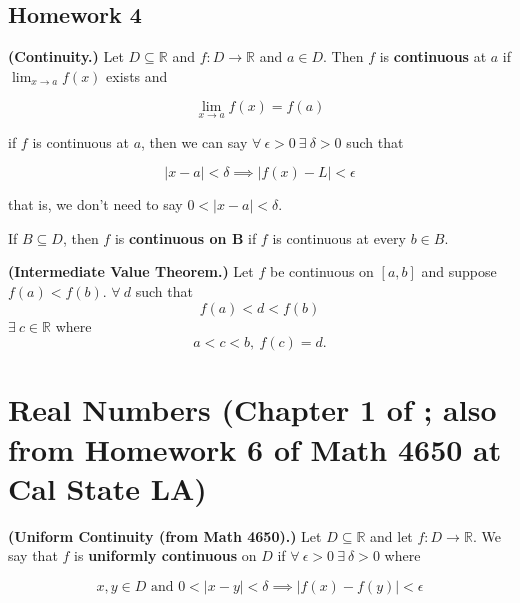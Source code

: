 \subsection{Homework 4}

\begin{definition} \textbf{(Continuity.)} Let \(D \subseteq \mathbb{R}\) and \(f:D \to \mathbb{R}\) and \(a \in D\). Then \(f\) is \textbf{continuous} at \(a\) if \(\lim_{x \to a} f(x)\) exists and 

\[
\lim_{x \to a} f(x) = f(a)
\]

\end{definition}

\begin{remark} if \(f\) is continuous at \(a\), then we can say \(\forall \ \epsilon > 0 \ \exists \ \delta > 0 \) such that

\[
|x - a| < \delta \implies |f(x) - L| < \epsilon
\]

that is, we don't need to say \(0 < |x - a| < \delta\).

\end{remark}

\begin{definition} If \(B \subseteq D\), then \(f\) is \textbf{continuous on B} if \(f\) is continuous at every \(b \in B\).

\end{definition}

\begin{theorem} \textbf{(Intermediate Value Theorem.)} Let \(f\) be continuous on \([a, b]\) and suppose \(f(a) < f(b)\). \(\forall \ d\) such that \[f(a) < d < f(b)\]  \(\exists \ c \in \mathbb{R}\) where \[a < c < b, \ f(c) = d.\]

\end{theorem}




%
%
%
%
%
%
%
%
%

\section{Real Numbers (Chapter 1 of \citet{pugh2015real}; also from Homework 6 of Math 4650 at Cal State LA)}

\begin{definition} \textbf{(Uniform Continuity (from Math 4650).)} Let \(D \subseteq \mathbb{R}\) and let \(f: D \to \mathbb{R}\). We say that \(f\) is \textbf{uniformly continuous} on \(D\) if \(\forall \ \epsilon > 0 \ \exists \ \delta > 0\) where

\[
x, y \in D \text{ and } 0 < |x - y| < \delta \implies |f(x) - f(y)| < \epsilon
\]

\end{definition}

